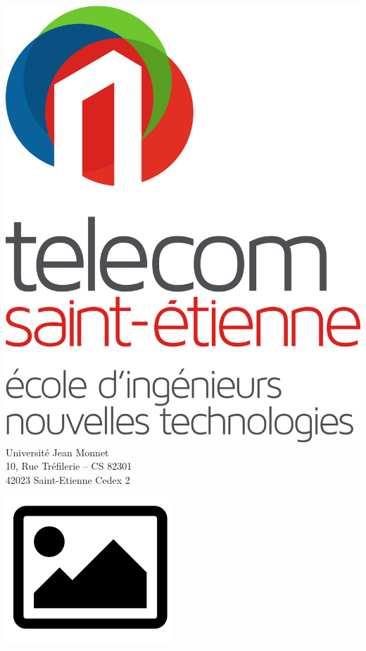 \begin{titlepage}

    \begin{minipage}[t]{0.462\textwidth}
        \vspace*{-\baselineskip}
        \begin{flushleft}
            \includegraphics[scale=0.08]{image/logo_telecom.png}\\
            Université Jean Monnet\\
            10, Rue Tréfilerie – CS 82301\\
            42023 Saint-Etienne Cedex 2
        \end{flushleft}
    \end{minipage}
    \hfill
    \begin{minipage}[t]{0.462\textwidth}
        \vspace*{-\baselineskip}
        \begin{flushright}
            \includegraphics[scale=0.2]{image/image.png}\\[0.4cm]

\end{flushright}
\end{minipage}
\end{titlepage}
